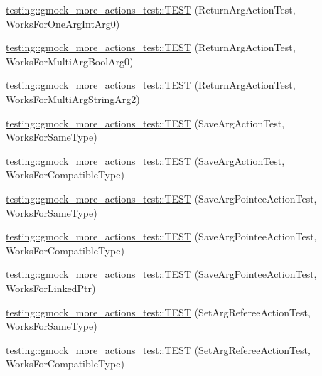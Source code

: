 \begin{DoxyCompactItemize}
\hyperlink{namespacetesting_1_1gmock__more__actions__test_a717ea38d7b78b6d51b4d617ed317d26e}{testing\+::gmock\+\_\+more\+\_\+actions\+\_\+test\+::\+T\+E\+ST} (Return\+Arg\+Action\+Test, Works\+For\+One\+Arg\+Int\+Arg0)
\item 
\hyperlink{namespacetesting_1_1gmock__more__actions__test_a0705d7e6083d129caae9d91cc5d6d570}{testing\+::gmock\+\_\+more\+\_\+actions\+\_\+test\+::\+T\+E\+ST} (Return\+Arg\+Action\+Test, Works\+For\+Multi\+Arg\+Bool\+Arg0)
\item 
\hyperlink{namespacetesting_1_1gmock__more__actions__test_ae280b3b95b0cdfcf7b81de95c8fe942d}{testing\+::gmock\+\_\+more\+\_\+actions\+\_\+test\+::\+T\+E\+ST} (Return\+Arg\+Action\+Test, Works\+For\+Multi\+Arg\+String\+Arg2)
\item 
\hyperlink{namespacetesting_1_1gmock__more__actions__test_a511b9c6721629465fd1e2fbd65633ef9}{testing\+::gmock\+\_\+more\+\_\+actions\+\_\+test\+::\+T\+E\+ST} (Save\+Arg\+Action\+Test, Works\+For\+Same\+Type)
\item 
\hyperlink{namespacetesting_1_1gmock__more__actions__test_a2b92b573de73fdf97dad4da8a67d7fc0}{testing\+::gmock\+\_\+more\+\_\+actions\+\_\+test\+::\+T\+E\+ST} (Save\+Arg\+Action\+Test, Works\+For\+Compatible\+Type)
\item 
\hyperlink{namespacetesting_1_1gmock__more__actions__test_a51d471708cb6fa3c403ea1d936a49dc1}{testing\+::gmock\+\_\+more\+\_\+actions\+\_\+test\+::\+T\+E\+ST} (Save\+Arg\+Pointee\+Action\+Test, Works\+For\+Same\+Type)
\item 
\hyperlink{namespacetesting_1_1gmock__more__actions__test_a35b74b32b6a222e048706e6ce8d64118}{testing\+::gmock\+\_\+more\+\_\+actions\+\_\+test\+::\+T\+E\+ST} (Save\+Arg\+Pointee\+Action\+Test, Works\+For\+Compatible\+Type)
\item 
\hyperlink{namespacetesting_1_1gmock__more__actions__test_afc168d80fe8ca16f0efc874587574e64}{testing\+::gmock\+\_\+more\+\_\+actions\+\_\+test\+::\+T\+E\+ST} (Save\+Arg\+Pointee\+Action\+Test, Works\+For\+Linked\+Ptr)
\item 
\hyperlink{namespacetesting_1_1gmock__more__actions__test_aa9fa575b30dca09e9886722b78415a22}{testing\+::gmock\+\_\+more\+\_\+actions\+\_\+test\+::\+T\+E\+ST} (Set\+Arg\+Referee\+Action\+Test, Works\+For\+Same\+Type)
\item 
\hyperlink{namespacetesting_1_1gmock__more__actions__test_af5a15dbcba14010a5463f3ac9451ab8a}{testing\+::gmock\+\_\+more\+\_\+actions\+\_\+test\+::\+T\+E\+ST} (Set\+Arg\+Referee\+Action\+Test, Works\+For\+Compatible\+Type)

\end{DoxyCompactItemize}
